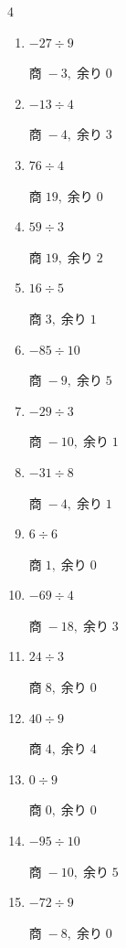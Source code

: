\begin{multicols}{4}
\begin{enumerate}
        $商\; -2,\; 余り\; 4$

  \item $-27 \div 9$

        $商\; -3,\; 余り\; 0$

  \item $-13 \div 4$

        $商\; -4,\; 余り\; 3$

  \item $76 \div 4$

        $商\; 19,\; 余り\; 0$

  \item $59 \div 3$

        $商\; 19,\; 余り\; 2$

  \item $16 \div 5$

        $商\; 3,\; 余り\; 1$

  \item $-85 \div 10$

        $商\; -9,\; 余り\; 5$

  \item $-29 \div 3$

        $商\; -10,\; 余り\; 1$

  \item $-31 \div 8$

        $商\; -4,\; 余り\; 1$

  \item $6 \div 6$

        $商\; 1,\; 余り\; 0$

  \item $-69 \div 4$

        $商\; -18,\; 余り\; 3$

  \item $24 \div 3$

        $商\; 8,\; 余り\; 0$

  \item $40 \div 9$

        $商\; 4,\; 余り\; 4$

  \item $0 \div 9$

        $商\; 0,\; 余り\; 0$

  \item $-95 \div 10$

        $商\; -10,\; 余り\; 5$

  \item $-72 \div 9$

        $商\; -8,\; 余り\; 0$


\end{enumerate}
\end{multicols}
